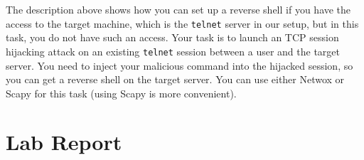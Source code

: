 The description above shows how you can set up a reverse shell if you have
the access to the target machine, which is the \texttt{telnet} server in
our setup, but in this task, you do not have such an access. Your task is 
to launch an TCP session hijacking attack on an existing \texttt{telnet}
session between a user and the target server. You need to inject your
malicious command into the hijacked session, so you can get a reverse
shell on the target server. You can use either Netwox or Scapy for this task (using Scapy is
more convenient).




\section{Lab Report}

\seedsubmission



